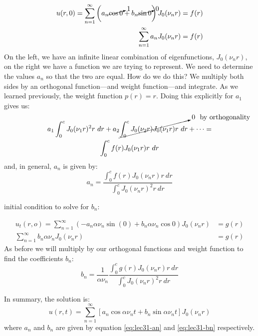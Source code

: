 \begin{align*}
u(r,0) = \sum\limits_{n=1}^{\infty} \left(a_n \cancelto{1}{\cos{0}} + b_n \cancelto{0}{\sin{0}}\right) J_0(\nu_n r) &= f(r) \\
\sum\limits_{n=1}^{\infty}a_nJ_0(\nu_n r) &= f(r)
\end{align*}
On the left, we have an infinite linear combination of eigenfunctions, $J_0(\nu_n r)$, on the right we have a function we are trying to represent.  We need to determine the values $a_n$ so that the two are equal.  How do we do this?  We multiply both sides by an orthogonal function---and weight function---and integrate.  As we learned previously, the weight function $p(r) = r$.  Doing this explicitly for $a_1$ gives us:
\begin{multline*}
a_1 \int_0^c J_0(\nu_1r)^2 r \ dr + a_2 \cancelto{0 \ \text{ by orthogonality}}{\int_0^c J_0(\nu_2r)J_0(\nu_1 r)r \ dr} + \cdots = \\ \int_0^c f(r)J_0(\nu_1r) r \ dr
\end{multline*}
and, in general, $a_n$ is given by:
\begin{equation}
a_n = \frac{\int_0^c f(r)J_0(\nu_n r) r \ dr}{\int_0^c J_0(\nu_n r)^2 r \ dr}
\label{eq:lec31-an}
\end{equation}

 initial condition to solve for $b_n$:

\begin{align*}
u_t(r,o) = \sum\limits_{n=1}^{\infty}\left(-a_n \alpha \nu_n \sin(0) + b_n \alpha \nu_n \cos{0} \right)J_0(\nu_n r) &= g(r) \\
\sum\limits_{n=1}^{\infty} b_n \alpha \nu_n J_0(\nu_n r) &= g(r)
\end{align*}
As before we will multiply by our orthogonal functions and weight function to find the coefficients $b_n$:
\begin{equation}
b_n = \frac{1}{\alpha \nu_n}\frac{\int_0^c g(r)J_0(\nu_n r) r \ dr}{\int_0^c J_0(\nu_n r)^2 r \ dr}
\label{eq:lec31-bn}
\end{equation}

\vspace{0.25cm}

\noindent In summary, the solution is:
\begin{equation}
u(r,t) = \sum\limits_{n=1}^{\infty} \left[a_n \cos{\alpha \nu_n t} + b_n \sin{\alpha \nu_n t} \right]J_0(\nu_n r)
\end{equation}
where $a_n$ and $b_n$ are given by equation \ref{eq:lec31-an} and \ref{eq:lec31-bn} respectively.

